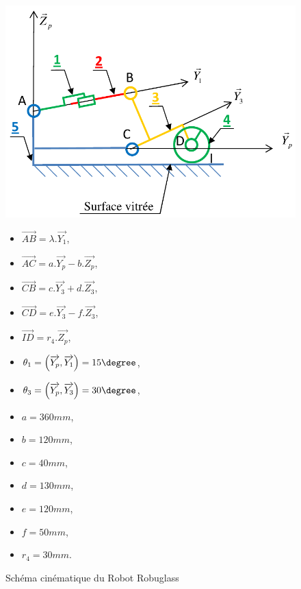 \begin{figure}[!h]
 \begin{minipage}{0.4\linewidth}
 \centering\includegraphics[width=\linewidth]{img/robuglass_cin.png}
 \end{minipage}
 \hfill
 \begin{minipage}{0.3\linewidth}
  \small
  \begin{itemize}
   \item $\overrightarrow{AB}=\lambda.\overrightarrow{Y_1}$,
   \item $\overrightarrow{AC}=a.\overrightarrow{Y_p}-b.\overrightarrow{Z_p}$,
   \item $\overrightarrow{CB}=c.\overrightarrow{Y_3}+d.\overrightarrow{Z_3}$,
   \item $\overrightarrow{CD}=e.\overrightarrow{Y_3}-f.\overrightarrow{Z_3}$,
   \item $\overrightarrow{ID}=r_4.\overrightarrow{Z_p}$,
   \item $\theta_1=\left(\overrightarrow{Y_p},\overrightarrow{Y_1}\right)=15\degree$,
   \item $\theta_3=\left(\overrightarrow{Y_p},\overrightarrow{Y_3}\right)=30\degree$,
   \end{itemize}
 \end{minipage}
  \hfill
 \begin{minipage}{0.25\linewidth}
  \begin{itemize}
   \item $a=360mm$,
   \item $b=120mm$,
   \item $c=40mm$,
   \item $d=130mm$,
   \item $e=120mm$,
   \item $f=50mm$,
   \item $r_4=30mm$.
   \end{itemize}
 \end{minipage}
 \caption{Schéma cinématique du Robot Robuglass}
 \label{robuglass_cin}
\end{figure}

